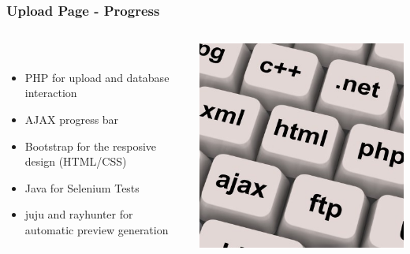 \begin{frame}
  \frametitle{Upload Page - Progress}
  \begin{columns}
  	\begin{column}{0.8\textwidth}
  \begin{description}[]
    \item[Technologies] \hfill \\
        \begin{itemize}
          \item PHP for upload and database interaction
          \item AJAX progress bar
	 \item Bootstrap for the resposive design (HTML/CSS)
	 \item Java for Selenium Tests
	 \item juju and rayhunter for automatic preview generation
        \end{itemize}
  
  \end{description} 
    \end{column}
    \begin{column}{0.2\textwidth}
   	  \includegraphics[width=\textwidth]{images/prog}
    \end{column}
  \end{columns}
\end{frame}


